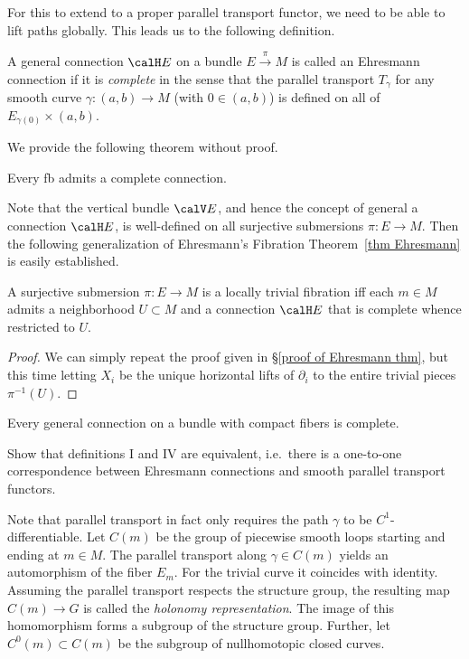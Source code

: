 For this to extend to a proper parallel transport functor, we need to be able to lift paths globally. This leads us to the following definition.

\begin{defn}
    A general connection $\calH E$ on a bundle $E\overset{\pi}{\to}M$ is called an Ehresmann connection if it is \emph{complete} in the sense that the parallel transport $T_\gamma$ for any smooth curve $\gamma:(a,b)\to M$ (with $0\in (a,b)$) is defined on all of $E_{\gamma(0)}\times (a,b)$. 
\end{defn}
We provide the following theorem without proof.
\begin{thm}
    Every \gls{fb} admits a complete connection.
\end{thm}

Note that the vertical bundle $\calV E$, and hence the concept of general a connection $\calH E$, is well-defined on all surjective submersions $\pi:E\to M$. Then the following generalization of Ehresmann's Fibration Theorem~\ref{thm Ehresmann} is easily established.
\begin{thm}[Ehresmann]
    A surjective submersion $\pi:E\to M$ is a locally trivial fibration iff  each $m\in M$ admits a neighborhood $U\subset M$ and a connection $\calH E$ that is complete whence restricted to $U$.
\end{thm}
\begin{proof}
    We can simply repeat the proof given in \S\ref{proof of Ehresmann thm}, but this time letting $X_i$ be the unique horizontal lifts of $\partial_i$ to the entire trivial pieces $\pi^{-1}(U)$.
\end{proof}

\begin{example}
    Every general connection on a bundle with compact fibers is complete. 
\end{example}


\begin{xca}
    Show that definitions I and IV are equivalent, i.e.\ there is a one-to-one correspondence between Ehresmann connections and smooth parallel transport functors.
\end{xca}


Note that parallel transport in fact only requires the path $\gamma$ to be $C^1$-differentiable. Let $C(m)$ be the group of piecewise smooth loops starting and ending at $m\in M$. The parallel transport along $\gamma\in C(m)$ yields an automorphism of the fiber $E_m$. For the trivial curve it coincides with identity. Assuming the parallel transport respects the structure group, the resulting map $C(m)\to G$ is called the \emph{holonomy representation}. The image of this homomorphism forms a subgroup of the structure group. Further, let $C^0(m)\subset C(m)$ be the subgroup of nullhomotopic closed curves.

